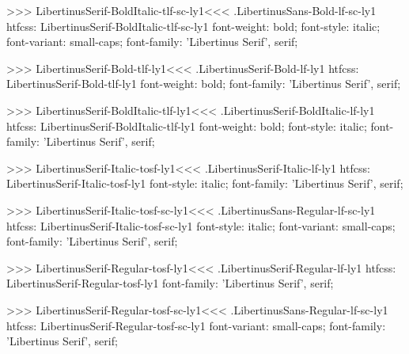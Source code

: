 >>>
\<LibertinusSerif-BoldItalic-tlf-sc-ly1\><<<
.LibertinusSans-Bold-lf-sc-ly1
htfcss:  LibertinusSerif-BoldItalic-tlf-sc-ly1  font-weight: bold; font-style: italic; font-variant: small-caps; font-family: 'Libertinus Serif', serif;

>>>
\<LibertinusSerif-Bold-tlf-ly1\><<<
.LibertinusSerif-Bold-lf-ly1
htfcss:  LibertinusSerif-Bold-tlf-ly1  font-weight: bold; font-family: 'Libertinus Serif', serif;

>>>
\<LibertinusSerif-BoldItalic-tlf-ly1\><<<
.LibertinusSerif-BoldItalic-lf-ly1
htfcss:  LibertinusSerif-BoldItalic-tlf-ly1  font-weight: bold; font-style: italic; font-family: 'Libertinus Serif', serif;

>>>
\<LibertinusSerif-Italic-tosf-ly1\><<<
.LibertinusSerif-Italic-lf-ly1
htfcss:  LibertinusSerif-Italic-tosf-ly1  font-style: italic; font-family: 'Libertinus Serif', serif;

>>>
\<LibertinusSerif-Italic-tosf-sc-ly1\><<<
.LibertinusSans-Regular-lf-sc-ly1
htfcss:  LibertinusSerif-Italic-tosf-sc-ly1  font-style: italic; font-variant: small-caps; font-family: 'Libertinus Serif', serif;

>>>
\<LibertinusSerif-Regular-tosf-ly1\><<<
.LibertinusSerif-Regular-lf-ly1
htfcss:  LibertinusSerif-Regular-tosf-ly1  font-family: 'Libertinus Serif', serif;

>>>
\<LibertinusSerif-Regular-tosf-sc-ly1\><<<
.LibertinusSans-Regular-lf-sc-ly1
htfcss:  LibertinusSerif-Regular-tosf-sc-ly1  font-variant: small-caps; font-family: 'Libertinus Serif', serif;


